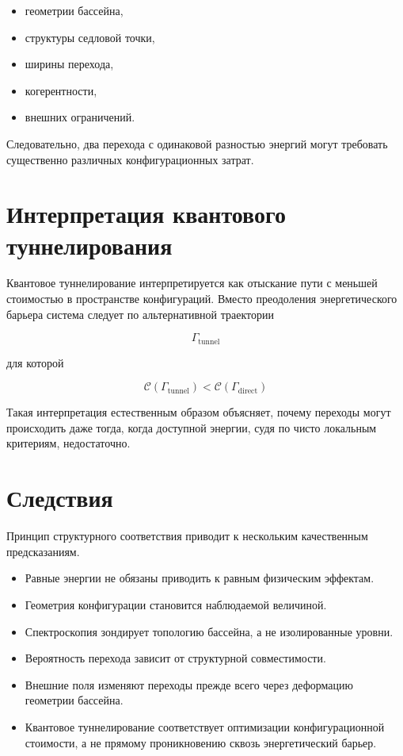 \begin{itemize}

\item геометрии бассейна,

\item структуры седловой точки,

\item ширины перехода,

\item когерентности,

\item внешних ограничений.

\end{itemize}

Следовательно, два перехода с одинаковой разностью энергий могут требовать существенно различных конфигурационных затрат.

\section{Интерпретация квантового туннелирования}

Квантовое туннелирование интерпретируется как отыскание пути с меньшей стоимостью в пространстве конфигураций. Вместо преодоления энергетического барьера система следует по альтернативной траектории

\[ \Gamma_{\mathrm{tunnel}} \]

для которой

\[ \boxed{ \mathcal C(\Gamma_{\mathrm{tunnel}}) < \mathcal C(\Gamma_{\mathrm{direct}}) } \]

Такая интерпретация естественным образом объясняет, почему переходы могут происходить даже тогда, когда доступной энергии, судя по чисто локальным критериям, недостаточно.

\section{Следствия}

Принцип структурного соответствия приводит к нескольким качественным предсказаниям.

\begin{itemize}

\item Равные энергии не обязаны приводить к равным физическим эффектам.

\item Геометрия конфигурации становится наблюдаемой величиной.

\item Спектроскопия зондирует топологию бассейна, а не изолированные уровни.

\item Вероятность перехода зависит от структурной совместимости.

\item Внешние поля изменяют переходы прежде всего
через деформацию геометрии бассейна.

\item Квантовое туннелирование соответствует оптимизации
конфигурационной стоимости, а не прямому проникновению
сквозь энергетический барьер.

\end{itemize}

